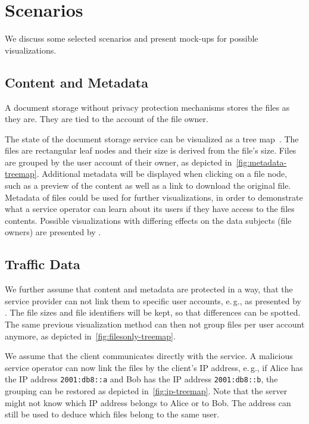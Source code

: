 \section{Scenarios}
We discuss some selected scenarios and present mock-ups for possible visualizations.

\subsection{Content and Metadata}
A document storage without privacy protection mechanisms stores the files as they are.
They are tied to the account of the file owner.

The state of the document storage service can be visualized as a tree map~\cite{DBLP:journals/ivs/GrahamK10}.
The files are rectangular leaf nodes and their size is derived from the file's size.
Files are grouped by the user account of their owner, as depicted in~\cref{fig:metadata-treemap}.
Additional metadata will be displayed when clicking on a file node, such as a preview of the content as well as a link to download the original file.
Metadata of files could be used for further visualizations, in order to demonstrate what a service operator can learn about its users if they have access to the files contents.
Possible visualizations with differing effects on the data subjects (file owners) are presented by \textcite{DBLP:journals/popets/HarkousRKA16,Krause:2017}.

\subsection{Traffic Data}
We further assume that content and metadata are protected in a way, that the service provider can not link them to specific user accounts, e.\,g., as presented by \textcite{securekeyvaluestorage-whitepaper}.
The file sizes and file identifiers will be kept, so that differences can be spotted.
The same previous visualization method can then not group files per user account anymore, as depicted in~\cref{fig:filesonly-treemap}.

We assume that the client communicates directly with the service.
A malicious service operator can now link the files by the client's IP address, e.\,g., if Alice has the IP address \texttt{2001:db8::a} and Bob has the IP address \texttt{2001:db8::b}, the grouping can be restored as depicted in~\cref{fig:ip-treemap}.
Note that the server might not know which IP address belongs to Alice or to Bob.
The address can still be used to deduce which files belong to the same user.

